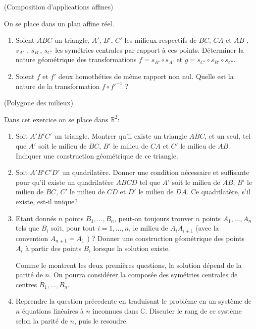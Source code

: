 \documentclass[a4paper,12pt,reqno]{amsart}
\begin{document}
\begin{exo} (Composition d'applications affines)

  On se place dans un plan affine réel.
  \begin{enumerate}
    \item Soient $ABC$ un triangle, $A'$, $B'$, $C'$ les milieux respectifs de $BC$, $CA$ et $AB$ , $s_{A'}$ , $s_{B'}$, $s_{C'}$ les symétries centrales par rapport à ces points. Déterminer la nature géométrique des transformations $f=s_{B'}\circ s_{A'}$ et $g=s_{C'}\circ s_{B'}\circ s_{C'}$.

    \item Soient $f$ et $f'$ deux homothéties de même rapport non nul. Quelle est la nature de la transformation $f\circ f'^{-1}$ ?
  \end{enumerate}
\end{exo}

\begin{exo} (Polygone des milieux)

  Dans cet exercice on se place dans $\mathbb{R}^{2}$:

  \begin{enumerate}
    \item Soit $A'B'C'$ un triangle. Montrer qu'il existe un triangle $ABC$, et un seul, tel que $A'$ soit le milieu de $BC$, $B'$ le milieu de $CA$ et $C'$ le milieu de $AB$. Indiquer une construction géométrique de ce triangle.

    \item Soit $A'B'C'D'$ un quadrilatère. Donner une condition nécessaire et suffisante pour qu'il existe un quadrilatère $ABCD$ tel que $A'$ soit le milieu de $AB$, $B'$ le milieu de $BC$, $C'$ le milieu de $CD$ et $D'$ le milieu de $DA$. Ce quadrilatère, s'il existe, est-il unique?

    \item\hard Etant donnés $n$ points $B_{1},\ldots,B_{n}$, peut-on toujours trouver $n$ points $A_{1},\ldots,A_{n}$ tels que $B_{i}$ soit, pour tout $i=1,\ldots,n$, le milieu de $A_{i}A_{i+1}$ (avec la convention $A_{n+1}=A_{1}$ ) ? Donner une construction géométrique des points $A_{i}$ à partir des points $B_{i}$ lorsque la solution existe.\newline
    \begin{indication}
      Comme le montrent les deux premières questions, la solution dépend de la parité de $n$. On pourra considérer la composée des symétries centrales de centres $B_{1},\ldots,B_{n}$.
    \end{indication}

    \item\hard Reprendre la question précedente en traduisant le problème en un système de $n$ équations linéaires à $n$ inconnues dans $\mathbb{C}$. Discuter le rang de ce système selon la parité de $n$, puis le resoudre.

  \end{enumerate}
\end{exo}
\end{document}
